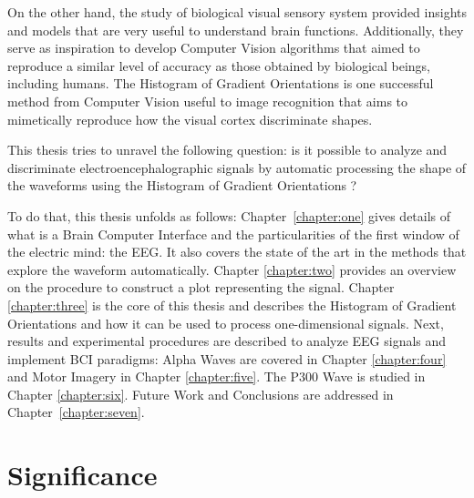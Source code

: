 
On the other hand, the study of biological visual sensory system provided insights and models that are very useful to understand brain functions.  Additionally, they serve as inspiration to develop Computer Vision algorithms that aimed to reproduce a similar level of accuracy as those obtained by biological beings, including humans.  The Histogram of Gradient Orientations is one successful method from Computer Vision useful to image recognition that aims to mimetically reproduce how the visual cortex discriminate shapes.

This thesis tries to unravel the following question:  is it possible to analyze and discriminate electroencephalographic signals by automatic processing the shape of the waveforms using the Histogram of Gradient Orientations ?


To do that, this thesis unfolds as follows: Chapter~\ref{chapter:one} gives details of what is a Brain Computer Interface and the particularities of the first window of the electric mind: the EEG. It also covers the state of the art in the methods that explore the waveform automatically.  Chapter \ref{chapter:two} provides an overview on the procedure to construct a plot representing the signal. Chapter \ref{chapter:three} is the core of this thesis and describes the Histogram of Gradient Orientations and how it can be used to process one-dimensional signals.
Next, results and experimental procedures are described to analyze EEG signals and implement BCI paradigms:  Alpha Waves are covered in Chapter \ref{chapter:four} and Motor Imagery in Chapter \ref{chapter:five}. The P300 Wave is studied in Chapter \ref{chapter:six}.  Future Work and Conclusions are addressed in Chapter~\ref{chapter:seven}.  


\section{Significance}

